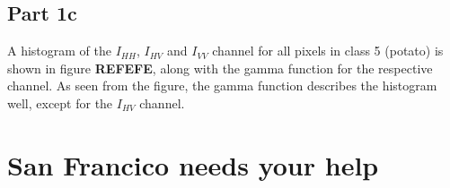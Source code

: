 \documentclass[a4paper]{article}
\begin{document}
\subsection*{Part 1c}
A histogram of the $ I_{HH} $, $ I_{HV} $ and $ I_{VV} $ channel for all pixels in class 5 (potato) is shown in figure \textbf{REFEFE}, along with the gamma function for the respective channel. As seen from the figure, the gamma function describes the histogram well, except for the $ I_{HV} $ channel. 

\section{San Francico needs your help}
\end{document}
